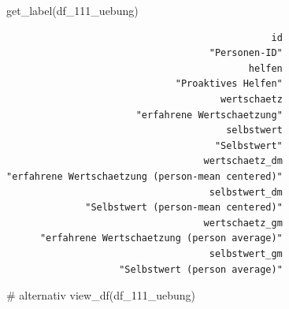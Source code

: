 \documentclass[
  letterpaper,
  DIV=11,
  numbers=noendperiod]{scrreprt}
\newenvironment{Shaded}{\begin{snugshade}}{\end{snugshade}}
\newcommand{\CommentTok}[1]{\textcolor[rgb]{0.37,0.37,0.37}{#1}}
\newcommand{\FunctionTok}[1]{\textcolor[rgb]{0.28,0.35,0.67}{#1}}
\newcommand{\NormalTok}[1]{\textcolor[rgb]{0.00,0.23,0.31}{#1}}
\begin{document}
\begin{Shaded}
\begin{Highlighting}[]
\FunctionTok{get\_label}\NormalTok{(df\_111\_uebung)}
\end{Highlighting}
\end{Shaded}

\begin{verbatim}
                                               id 
                                    "Personen-ID" 
                                           helfen 
                              "Proaktives Helfen" 
                                      wertschaetz 
                       "erfahrene Wertschaetzung" 
                                       selbstwert 
                                     "Selbstwert" 
                                   wertschaetz_dm 
"erfahrene Wertschaetzung (person-mean centered)" 
                                    selbstwert_dm 
              "Selbstwert (person-mean centered)" 
                                   wertschaetz_gm 
      "erfahrene Wertschaetzung (person average)" 
                                    selbstwert_gm 
                    "Selbstwert (person average)" 
\end{verbatim}

\begin{Shaded}
\begin{Highlighting}[]
\CommentTok{\# alternativ}
\FunctionTok{view\_df}\NormalTok{(df\_111\_uebung)}
\end{Highlighting}
\end{Shaded}
\end{document}
